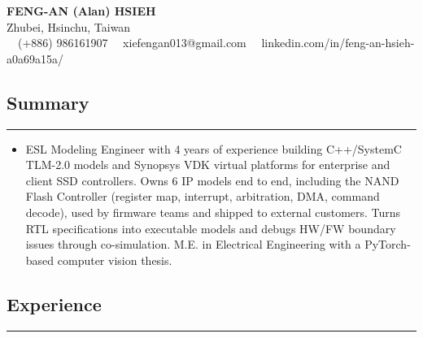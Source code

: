 \documentclass[11pt,a4paper]{article}
\begin{document}
\begin{center}
	{\LARGE \textbf{FENG-AN (Alan) HSIEH}}\\
	Zhubei, Hsinchu, Taiwan
	\vspace{0.05cm}
	\\
	\raisebox{-0.2\height}{\Large \faPhoneSquare} \ \ (+886) 986161907 
    \raisebox{-0.2\height}{\Large \faEnvelopeSquare} \ \ xiefengan013@gmail.com 
    \raisebox{-0.2\height}{\Large \faLinkedinSquare} \ \ linkedin.com/in/feng-an-hsieh-a0a69a15a/
\end{center}

\subsection*{\large Summary}
\hrule
\vspace{0.3em}

\begin{itemize}[leftmargin=1em,noitemsep]
	\item[]
    ESL Modeling Engineer with 4 years of experience building C++/SystemC TLM-2.0 models and Synopsys VDK virtual platforms for enterprise and client SSD controllers. Owns 6 IP models end to end, including the NAND Flash Controller (register map, interrupt, arbitration, DMA, command decode), used by firmware teams and shipped to external customers. Turns RTL specifications into executable models and debugs HW/FW boundary issues through co-simulation. M.E. in Electrical Engineering with a PyTorch-based computer vision thesis.
\end{itemize}

\subsection*{\large Experience}
\hrule
\vspace{0.3em}
\end{document}
